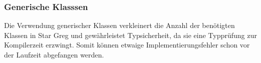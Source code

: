 \subsubsection{Generische Klasssen}
\label{subsub:fachkonzept-implementierung-erläuterung-generisch}

Die Verwendung generischer Klassen verkleinert die Anzahl der benötigten Klassen in Star Greg und gewährleistet Typsicherheit, da sie eine Typprüfung zur Kompilerzeit erzwingt. Somit können etwaige Implementierungsfehler schon vor der Laufzeit abgefangen werden. 